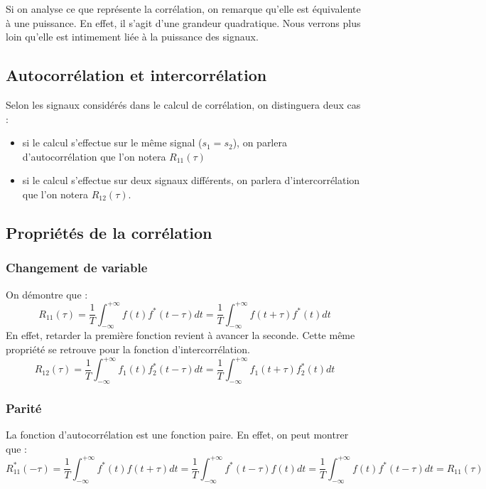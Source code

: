 	Si on analyse ce que représente la corrélation, on remarque qu'elle est équivalente à une puissance. En effet, il s'agit d'une grandeur quadratique. Nous verrons plus loin qu'elle est intimement liée à la puissance des signaux.
	
	
	\subsection{Autocorrélation et intercorrélation}
	
	Selon les signaux considérés dans le calcul de corrélation, on distinguera deux cas :
	\begin{itemize}
		\item si le calcul s'effectue sur le même signal ($s_{1} = s_{2}$), on parlera d'autocorrélation que l'on notera $R_{11}(\tau)$
		\item si le calcul s'effectue sur deux signaux différents, on parlera d'intercorrélation que l'on notera $R_{12}(\tau)$.
	\end{itemize}
	
	
	\subsection{Propriétés de la corrélation}
	
	\subsubsection{Changement de variable}
	
	On démontre que :
	\begin{equation}\label{key}
	R_{11}(\tau)=\frac{1}{T}\int_{-\infty}^{+\infty}f(t)f^{*}(t-\tau)dt=\frac{1}{T}\int_{-\infty}^{+\infty}f(t+\tau)f^{*}(t)dt
	\end{equation}
	En effet, retarder la première fonction revient à avancer la seconde. Cette même propriété se retrouve pour la fonction d'intercorrélation.
	\begin{equation}\label{key}
	R_{12}(\tau)=\frac{1}{T}\int_{-\infty}^{+\infty}f_{1}(t)f^{*}_{2}(t-\tau)dt=\frac{1}{T}\int_{-\infty}^{+\infty}f_{1}(t+\tau)f^{*}_{2}(t)dt
	\end{equation}
	
	\subsubsection{Parité}
	La fonction d'autocorrélation est une fonction paire. En effet, on peut montrer que :
	\begin{equation}\label{key}
	R^{*}_{11}(-\tau)=\frac{1}{T}\int_{-\infty}^{+\infty}f^{*}(t)f(t+\tau)dt=\frac{1}{T}\int_{-\infty}^{+\infty}f^{*}(t-\tau)f(t)dt=\frac{1}{T}\int_{-\infty}^{+\infty}f(t)f^{*}(t-\tau)dt=R_{11}(\tau)
	\end{equation}
	
